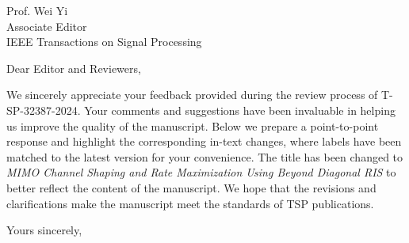 \documentclass[
	fontsize=11pt,
	paper=a4,
	foldmarks=false
]{scrartcl}
\begin{document}
\begin{letter}{%
		Prof. Wei Yi\\
		Associate Editor\\
		IEEE Transactions on Signal Processing
	}
	\opening{Dear Editor and Reviewers,}
	We sincerely appreciate your feedback provided during the review process of T-SP-32387-2024.
	Your comments and suggestions have been invaluable in helping us improve the quality of the manuscript.
	Below we prepare a point-to-point response and highlight the corresponding in-text changes, where labels have been matched to the latest version for your convenience.
	The title has been changed to \emph{MIMO Channel Shaping and Rate Maximization Using Beyond Diagonal RIS} to better reflect the content of the manuscript.
	We hope that the revisions and clarifications make the manuscript meet the standards of TSP publications.
	\closing{Yours sincerely,}
\end{letter}
\end{document}
